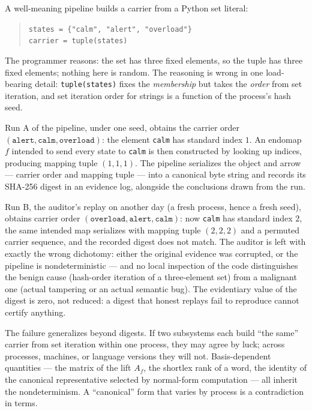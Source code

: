 A well-meaning pipeline builds a carrier from a Python set literal:

\begin{quote}
\texttt{states = \{"calm", "alert", "overload"\}}\\
\texttt{carrier = tuple(states)}
\end{quote}

The programmer reasons: the set has three fixed elements, so the tuple has
three fixed elements; nothing here is random. The reasoning is wrong in one
load-bearing detail: \texttt{tuple(states)} fixes the \emph{membership} but
takes the \emph{order} from set iteration, and set iteration order for
strings is a function of the process's hash seed.

Run A of the pipeline, under one seed, obtains the carrier order
$(\texttt{alert}, \texttt{calm}, \texttt{overload})$: the element
\texttt{calm} has standard index $1$. An endomap $f$ intended to send every
state to \texttt{calm} is then constructed by looking up indices, producing
mapping tuple $(1, 1, 1)$. The pipeline serializes the object and arrow ---
carrier order and mapping tuple --- into a canonical byte string and records
its SHA-256 digest in an evidence log, alongside the conclusions drawn from
the run.

Run B, the auditor's replay on another day (a fresh process, hence a fresh
seed), obtains carrier order
$(\texttt{overload}, \texttt{alert}, \texttt{calm})$: now \texttt{calm} has
standard index $2$, the same intended map serializes with mapping tuple
$(2, 2, 2)$ and a permuted carrier sequence, and the recorded digest does not
match. The auditor is left with exactly the wrong dichotomy: either the
original evidence was corrupted, or the pipeline is nondeterministic --- and
no local inspection of the code distinguishes the benign cause (hash-order
iteration of a three-element set) from a malignant one (actual tampering or
an actual semantic bug). The evidentiary value of the digest is zero, not
reduced: a digest that honest replays fail to reproduce cannot certify
anything.

The failure generalizes beyond digests. If two subsystems each build ``the
same'' carrier from set iteration within one process, they may agree by
luck; across processes, machines, or language versions they will not.
Basis-dependent quantities --- the matrix of the lift $A_f$, the shortlex
rank of a word, the identity of the canonical representative selected by
normal-form computation --- all inherit the nondeterminism. A ``canonical''
form that varies by process is a contradiction in terms.

